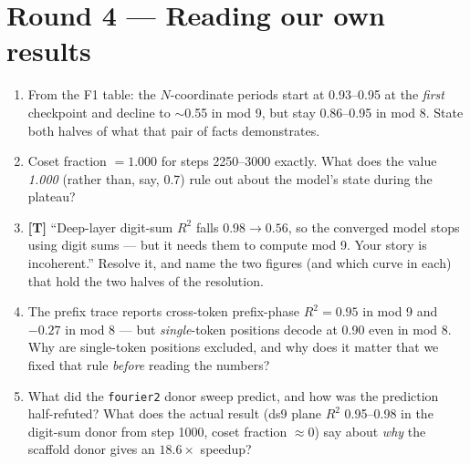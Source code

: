\documentclass[11pt]{article}
\newcommand{\trap}{\textcolor{trapcol}{\textbf{[T]}}}
\begin{document}
\section*{Round 4 --- Reading our own results}
\begin{enumerate}[leftmargin=*,itemsep=4pt,start=16]
\item From the F1 table: the $N$-coordinate periods start at 0.93--0.95 at the
\emph{first} checkpoint and decline to $\sim$0.55 in mod 9, but stay 0.86--0.95 in
mod 8. State both halves of what that pair of facts demonstrates.
\item Coset fraction $= 1.000$ for steps 2250--3000 exactly. What does the value
\emph{1.000} (rather than, say, 0.7) rule out about the model's state during the
plateau?
\item \trap{} ``Deep-layer digit-sum $R^2$ falls $0.98 \to 0.56$, so the converged
model stops using digit sums --- but it needs them to compute mod 9. Your story is
incoherent.'' Resolve it, and name the two figures (and which curve in each) that
hold the two halves of the resolution.
\item The prefix trace reports cross-token prefix-phase $R^2 = 0.95$ in mod 9 and
$-0.27$ in mod 8 --- but \emph{single}-token positions decode at 0.90 even in
mod 8. Why are single-token positions excluded, and why does it matter that we
fixed that rule \emph{before} reading the numbers?
\item What did the \texttt{fourier2} donor sweep predict, and how was the prediction
half-refuted? What does the actual result (ds9 plane $R^2$ 0.95--0.98 in the
digit-sum donor from step 1000, coset fraction $\approx 0$) say about \emph{why}
the scaffold donor gives an $18.6\times$ speedup?
\end{enumerate}
\end{document}
